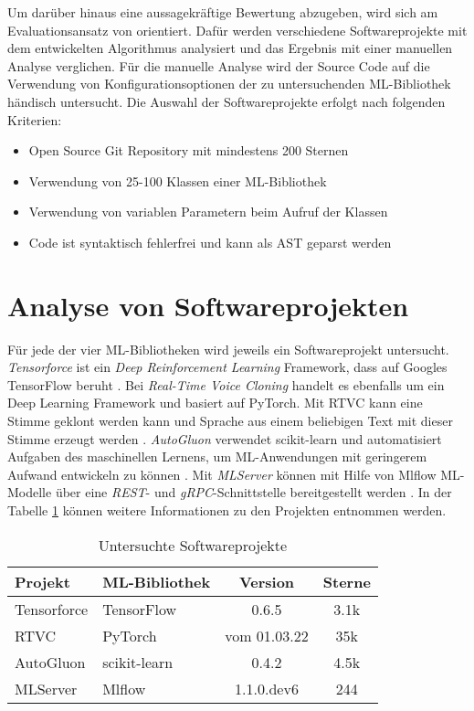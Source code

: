 \documentclass[german,bachelor]{swsLeipzig}
\begin{document}
Um darüber hinaus eine aussagekräftige Bewertung abzugeben, wird sich am Evaluationsansatz von \citeauthor{10.1145/1985793.1985812}
orientiert.
Dafür werden verschiedene Softwareprojekte mit dem entwickelten Algorithmus analysiert und das Ergebnis mit einer manuellen Analyse verglichen.
Für die manuelle Analyse wird der Source Code auf die Verwendung von Konfigurationsoptionen der zu untersuchenden ML-Bibliothek
händisch untersucht. Die Auswahl der Softwareprojekte erfolgt nach folgenden Kriterien:
\begin{itemize}
 \item Open Source Git Repository mit mindestens 200 Sternen
 \item Verwendung von 25-100 Klassen einer ML-Bibliothek
 \item Verwendung von variablen Parametern beim Aufruf der Klassen
 \item Code ist syntaktisch fehlerfrei und kann als AST geparst werden
\end{itemize}

\section{Analyse von Softwareprojekten}
Für jede der vier ML-Bibliotheken wird jeweils ein Softwareprojekt untersucht.
\textit{Tensorforce} ist ein \textit{Deep Reinforcement Learning} Framework, dass auf Googles TensorFlow beruht \cite[]{tensorforce}.
Bei \textit{Real-Time Voice Cloning} handelt es ebenfalls um ein Deep Learning Framework und basiert auf PyTorch.
Mit RTVC kann eine Stimme geklont werden kann und Sprache aus einem beliebigen Text mit dieser Stimme erzeugt werden \cite[]{Charles2013}.
\textit{AutoGluon} verwendet scikit-learn und automatisiert Aufgaben des maschinellen Lernens, um ML-Anwendungen mit geringerem
Aufwand entwickeln zu können \cite[]{agtabular}.
Mit \textit{MLServer} können mit Hilfe von Mlflow ML-Modelle über eine \textit{REST}- und \textit{gRPC}-Schnittstelle bereitgestellt werden \cite[]{Charles2u013}.
In der Tabelle \ref{projekte} können weitere Informationen zu den Projekten entnommen werden.

\begin{table}[H]
\small
\begin{center}
\begin{tabular}[h]{l|l|c|c}
\hline
Projekt & ML-Bibliothek & Version & Sterne \\
\hline \hline
Tensorforce & TensorFlow & 0.6.5 & 3.1k \\
RTVC & PyTorch & vom 01.03.22 & 35k\\
AutoGluon & scikit-learn & 0.4.2 & 4.5k\\
MLServer & Mlflow & 1.1.0.dev6 & 244\\
\hline
\end{tabular}
\caption{Untersuchte Softwareprojekte} \label{projekte}
\end{center}
\end{table}
\end{document}

